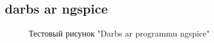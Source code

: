 \documentclass{report}
\begin{document}
\subsection{darbs ar ngspice}
\begin{figure}[h]
\caption{Тестовый рисунок "Darbs ar programmu ngspice"}
\label{fig:image}
\end{figure}
\end{document}
